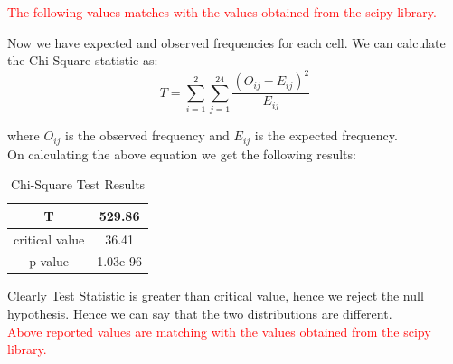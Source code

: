\documentclass[12pt, letterpaper]{article}
\begin{document}
\textcolor{red}{The following values matches with the values obtained from the scipy library.}

\newpage

Now we have expected and observed frequencies for each cell. We can calculate the Chi-Square statistic as: \\

\[ \boxed{T = \sum_{i=1}^{2} \sum_{j=1}^{24} \frac{(O_{ij} - E_{ij})^2}{E_{ij}} } \]

where $O_{ij}$ is the observed frequency and $E_{ij}$ is the expected frequency. \\

On calculating the above equation we get the following results:
\begin{table}[h]
    \centering
    \begin{tabular}{|c|c|}
    \hline
    T &  529.86 \\ \hline
    critical value & 36.41 \\ \hline
    p-value & 1.03e-96 \\ \hline
    \end{tabular}
    \caption{Chi-Square Test Results}
\end{table}

Clearly Test Statistic is greater than critical value, hence we reject the null hypothesis. Hence we can say that the two distributions are different. \\

\textcolor{red}{Above reported values are matching with the values obtained from the scipy library.}
\end{document}
